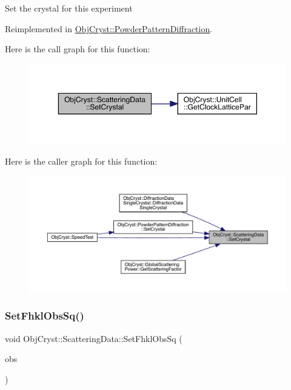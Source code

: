 Set the crystal for this experiment 

Reimplemented in \mbox{\hyperlink{class_obj_cryst_1_1_powder_pattern_diffraction_a5e32e21896fdd947add0cc47fad0bc87}{Obj\+Cryst\+::\+Powder\+Pattern\+Diffraction}}.

Here is the call graph for this function\+:
\nopagebreak
\begin{figure}[H]
\begin{center}
\leavevmode
\includegraphics[width=350pt]{class_obj_cryst_1_1_scattering_data_a590a553dbea1970266a864256ebf94f3_cgraph}
\end{center}
\end{figure}
Here is the caller graph for this function\+:
\nopagebreak
\begin{figure}[H]
\begin{center}
\leavevmode
\includegraphics[width=350pt]{class_obj_cryst_1_1_scattering_data_a590a553dbea1970266a864256ebf94f3_icgraph}
\end{center}
\end{figure}
\mbox{\label{class_obj_cryst_1_1_scattering_data_acfdcb6eb721579f7cfe270d36cd7e259}} 
\subsubsection{\texorpdfstring{SetFhklObsSq()}{SetFhklObsSq()}}
{\footnotesize\ttfamily void Obj\+Cryst\+::\+Scattering\+Data\+::\+Set\+Fhkl\+Obs\+Sq (\begin{DoxyParamCaption}\item[{const Cryst\+Vector\+\_\+\+R\+E\+AL \&}]{obs }\end{DoxyParamCaption})}

